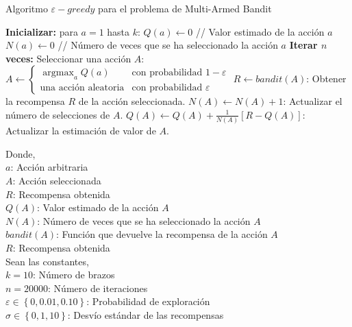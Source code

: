 \documentclass[12pt]{article}
\DeclareMathOperator*{\argmax}{argmax}
\begin{document}
    \begin{algorithm}[H]
        \caption{Algoritmo $\varepsilon-greedy$ para el problema de Multi-Armed Bandit}
        \begin{algorithmic}[1]
            \State \textbf{Inicializar:} para $a = 1$ hasta $k$:
            \State \quad $Q(a) \leftarrow 0$ \quad // Valor estimado de la acción $a$
            \State \quad $N(a) \leftarrow 0$ \quad // Número de veces que se ha seleccionado la acción $a$
            \State \textbf{Iterar $n$ veces:}
            \State \quad Seleccionar una acción $A$:
            \State \quad \quad $A \leftarrow
            \begin{cases}
                \argmax_{a} Q(a) & \text{con probabilidad } 1 - \varepsilon \\
                \text{una acción aleatoria} & \text{con probabilidad } \varepsilon
            \end{cases}$
            \State \quad $R \leftarrow bandit(A)$: Obtener la recompensa $R$ de la acción seleccionada.
            \State \quad $N(A) \leftarrow N(A) + 1$: Actualizar el número de selecciones de $A$.
            \State \quad $Q(A) \leftarrow Q(A) + \frac{1}{N(A)} [R - Q(A)]$: Actualizar la estimación de valor de $A$.
        \end{algorithmic}\label{alg:epsilon_greedy}
    \end{algorithm}

    Donde,\\
    $a$: Acción arbitraria \\
    $A$: Acción seleccionada \\
    $R$: Recompensa obtenida \\
    $Q(A)$: Valor estimado de la acción $A$ \\
    $N(A)$: Número de veces que se ha seleccionado la acción $A$ \\
    $bandit(A)$: Función que devuelve la recompensa de la acción $A$ \\
    $R$: Recompensa obtenida \\

    Sean las constantes, \\
    $k = 10$: Número de brazos \\
    $n = 20000$: Número de iteraciones \\
    $\varepsilon \in \left\{ 0, 0.01, 0.10 \right\}$: Probabilidad de exploración \\
    $\sigma \in \left\{ 0, 1, 10 \right\}$: Desvío estándar de las recompensas \\
\end{document}
